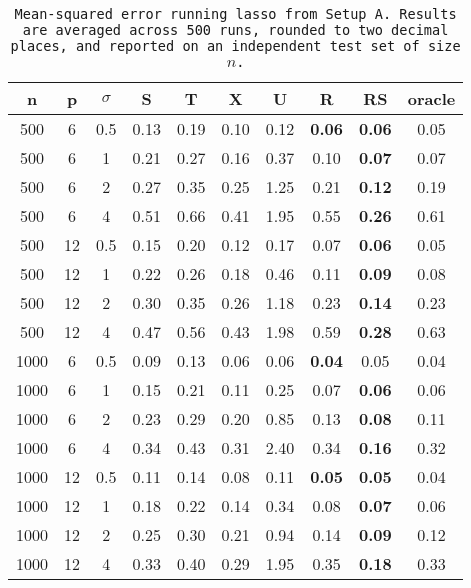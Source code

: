 \begin{table}[ht]
\centering
\begin{tabular}{cccccccccc}
  \hline
n & p & $\sigma$ & S & T & X & U & R & RS & oracle \\ 
  \hline
500 & 6 & 0.5 & 0.13 & 0.19 & 0.10 & 0.12 & \bf 0.06 & \bf 0.06 & 0.05 \\ 
  500 & 6 & 1 & 0.21 & 0.27 & 0.16 & 0.37 & 0.10 & \bf 0.07 & 0.07 \\ 
  500 & 6 & 2 & 0.27 & 0.35 & 0.25 & 1.25 & 0.21 & \bf 0.12 & 0.19 \\ 
  500 & 6 & 4 & 0.51 & 0.66 & 0.41 & 1.95 & 0.55 & \bf 0.26 & 0.61 \\ 
  500 & 12 & 0.5 & 0.15 & 0.20 & 0.12 & 0.17 & 0.07 & \bf 0.06 & 0.05 \\ 
  500 & 12 & 1 & 0.22 & 0.26 & 0.18 & 0.46 & 0.11 & \bf 0.09 & 0.08 \\ 
  500 & 12 & 2 & 0.30 & 0.35 & 0.26 & 1.18 & 0.23 & \bf 0.14 & 0.23 \\ 
  500 & 12 & 4 & 0.47 & 0.56 & 0.43 & 1.98 & 0.59 & \bf 0.28 & 0.63 \\ 
  1000 & 6 & 0.5 & 0.09 & 0.13 & 0.06 & 0.06 & \bf 0.04 & 0.05 & 0.04 \\ 
  1000 & 6 & 1 & 0.15 & 0.21 & 0.11 & 0.25 & 0.07 & \bf 0.06 & 0.06 \\ 
  1000 & 6 & 2 & 0.23 & 0.29 & 0.20 & 0.85 & 0.13 & \bf 0.08 & 0.11 \\ 
  1000 & 6 & 4 & 0.34 & 0.43 & 0.31 & 2.40 & 0.34 & \bf 0.16 & 0.32 \\ 
  1000 & 12 & 0.5 & 0.11 & 0.14 & 0.08 & 0.11 & \bf 0.05 & \bf 0.05 & 0.04 \\ 
  1000 & 12 & 1 & 0.18 & 0.22 & 0.14 & 0.34 & 0.08 & \bf 0.07 & 0.06 \\ 
  1000 & 12 & 2 & 0.25 & 0.30 & 0.21 & 0.94 & 0.14 & \bf 0.09 & 0.12 \\ 
  1000 & 12 & 4 & 0.33 & 0.40 & 0.29 & 1.95 & 0.35 & \bf 0.18 & 0.33 \\ 
   \hline
\end{tabular}
\caption{\tt Mean-squared error running \texttt{lasso} from Setup A. Results are averaged across 500 runs, rounded to two decimal places, and reported on an independent test set of size $n$.} 
\label{table:setup1}
\end{table}
